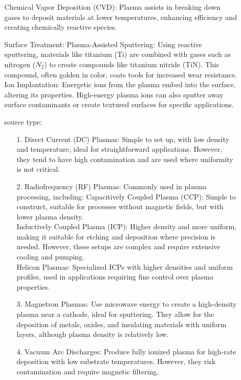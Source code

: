\documentclass{article}
\begin{document}
\begin{itemize}
\begin{itemize}
        Chemical Vapor Deposition (CVD): Plasma assists in breaking down gases to deposit materials at lower temperatures, enhancing efficiency and creating chemically reactive species.
        \item [Surface Treatment:]
        Plasma-Assisted Sputtering: Using reactive sputtering, materials like titanium (Ti) are combined with gases such as nitrogen (\(N_2\)) to create compounds like titanium nitride (TiN). This compound, often golden in color, coats tools for increased wear resistance.
        \\
        Ion Implantation: Energetic ions from the plasma embed into the surface, altering its properties. High-energy plasma ions can also sputter away surface contaminants or create textured surfaces for specific applications.
        \item [source type:]
        \begin{itemize}
            \item [1.]Direct Current (DC) Plasmas: Simple to set up, with low density and temperature, ideal for straightforward applications. However, they tend to have high contamination and are used where uniformity is not critical.
            \item [2.]Radiofrequency (RF) Plasmas: Commonly used in plasma processing, including:
            Capacitively Coupled Plasma (CCP): Simple to construct, suitable for processes without magnetic fields, but with lower plasma density.
            \\
            Inductively Coupled Plasma (ICP): Higher density and more uniform, making it suitable for etching and deposition where precision is needed. However, these setups are complex and require extensive cooling and pumping.
            \\
            Helicon Plasmas: Specialized ICPs with higher densities and uniform profiles, used in applications requiring fine control over plasma properties.
            \item [3.] Magnetron Plasmas: Use microwave energy to create a high-density plasma near a cathode, ideal for sputtering. They allow for the deposition of metals, oxides, and insulating materials with uniform layers, although plasma density is relatively low.
            \item [4.] Vacuum Arc Discharges: Produce fully ionized plasma for high-rate deposition with low substrate temperatures. However, they risk contamination and require magnetic filtering.
        \end{itemize}
    \end{itemize}
\end{itemize}
\end{document}
